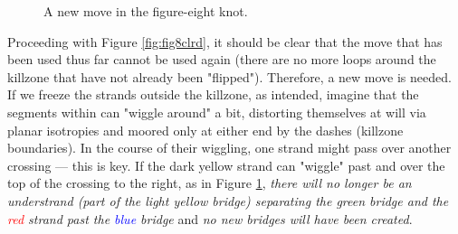 \documentclass[titlepage]{article}
\begin{document}
\begin{figure}[h!]
    \centering
    \caption{A new move in the figure-eight knot.}
    \label{fig:fig8clr-2}
\end{figure}

Proceeding with Figure \ref{fig:fig8clrd}, it should be clear that the move that has been used thus far cannot be used again (there are no more loops around the killzone that have not already been "flipped"). Therefore, a new move is needed. If we freeze the strands outside the killzone, as intended, imagine that the segments within can "wiggle around" a bit, distorting themselves at will via planar isotropies and moored only at either end by the dashes (killzone boundaries). In the course of their wiggling, one strand might pass over another crossing --- this is key. If the \textcolor{yly}{dark yellow} strand can "wiggle" past and over the top of the crossing to the right, as in Figure \ref{fig:fig8clr-2}, \emph{there will no longer be an understrand (part of the \textcolor{ylz}{light yellow} bridge) separating the \textcolor{grx}{green} bridge and the \textcolor{red}{red} strand past the \textcolor{blue}{blue} bridge} and \emph{no new bridges will have been created}.\par
\end{document}
